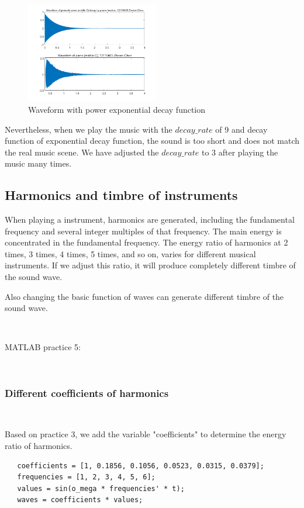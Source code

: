 \documentclass[journal]{IEEEtran}
\begin{document}
\begin{figure}[htbp]
   \centering
   \includegraphics[width=0.52\textwidth]{p4.png} 
   \caption{Waveform with power exponential decay function}
   \label{fig:4}
   \end{figure}
   Nevertheless, 
   when we play the music with the $decay\_rate$ of 9 and decay function of exponential decay function, 
   the sound is too short and does not match the real music scene. We have adjusted the $decay\_rate$ to 3 after playing the music many times.


\subsection{Harmonics and timbre of instruments}
When playing a instrument, harmonics are generated, including the fundamental frequency and several integer multiples of that frequency. The main energy is concentrated in the fundamental frequency. The energy ratio of harmonics at 2 times, 3 times, 4 times, 5 times, and so on, varies for different musical instruments. If we adjust this ratio, it will produce completely different timbre of the sound wave.

Also changing the basic function of waves can generate different timbre of the sound wave.

$~$

\textcolor[rgb]{0,0.6,1}{MATLAB practice 5:}

$~$

\subsubsection{Different coefficients of harmonics}


$~$

Based on practice 3, we add the variable "coefficients" to determine the energy ratio of harmonics.

\begin{lstlisting}[style=Matlab-editor]
   % coefficients and frequencies of harmonics
   coefficients = [1, 0.1856, 0.1056, 0.0523, 0.0315, 0.0379]; 
   frequencies = [1, 2, 3, 4, 5, 6]; 
   values = sin(o_mega * frequencies' * t); 
   waves = coefficients * values; 
\end{lstlisting}
\end{document}
